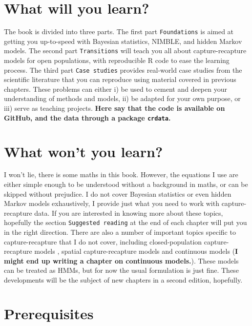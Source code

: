 \documentclass[
  12pt,
]{krantz}
\begin{document}
\section*{What will you learn?}\label{what-will-you-learn}


The book is divided into three parts. The first part \texttt{Foundations} is aimed at getting you up-to-speed with Bayesian statistics, NIMBLE, and hidden Markov models. The second part \texttt{Transitions} will teach you all about capture-recapture models for open populations, with reproducible R code to ease the learning process. The third part \texttt{Case\ studies} provides real-world case studies from the scientific literature that you can reproduce using material covered in previous chapters. These problems can either i) be used to cement and deepen your understanding of methods and models, ii) be adapted for your own purpose, or iii) serve as teaching projects. \textbf{Here say that the code is available on GitHub, and the data through a package \texttt{crdata}.}

\section*{What won't you learn?}\label{what-wont-you-learn}


I won't lie, there is some maths in this book. However, the equations I use are either simple enough to be understood without a background in maths, or can be skipped without prejudice. I do not cover Bayesian statistics or even hidden Markov models exhaustively, I provide just what you need to work with capture-recapture data. If you are interested in knowing more about these topics, hopefully the section \texttt{Suggested\ reading} at the end of each chapter will put you in the right direction. There are also a number of important topics specific to capture-recapture that I do not cover, including closed-population capture-recapture models \citep{WilliamsEtAl2002}, spatial capture-recapture models \citep{RoyleEtAl2013book} and continuous models \citep{rushing2023continuouscr} (\textbf{I might end up writing a chapter on continuous models.}). These models can be treated as HMMs, but for now the usual formulation is just fine. These developments will be the subject of new chapters in a second edition, hopefully.

\section*{Prerequisites}\label{prerequisites}
\end{document}
